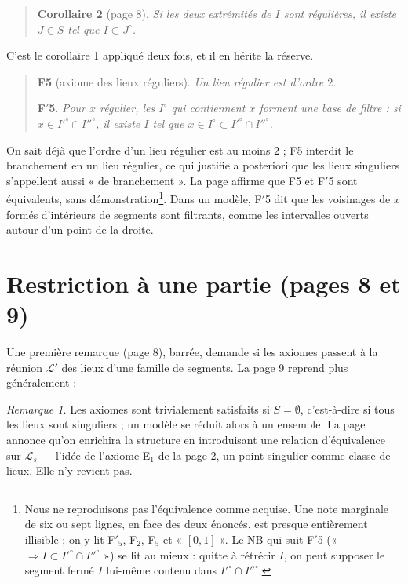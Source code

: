 \documentclass[11pt,a4paper]{article}
\begin{document}
\begin{quote}
\textbf{Corollaire 2} (page 8). \emph{Si les deux extrémités de $I$ sont
régulières, il existe $J \in S$ tel que $I \subset J^{\circ}$.}
\end{quote}

C'est le corollaire 1 appliqué deux fois, et il en hérite la réserve.

\begin{quote}
\textbf{F5} (axiome des lieux réguliers). \emph{Un lieu régulier est d'ordre
$2$.}

\textbf{F$'$5}. \emph{Pour $x$ régulier, les $I^{\circ}$ qui contiennent $x$
forment une base de filtre : si $x \in I'^{\circ} \cap I''^{\circ}$, il
existe $I$ tel que $x \in I^{\circ} \subset I'^{\circ} \cap I''^{\circ}$.}
\end{quote}

On sait déjà que l'ordre d'un lieu régulier est au moins $2$ ; F5 interdit le
branchement en un lieu régulier, ce qui justifie a posteriori que les
lieux singuliers s'appellent aussi « de branchement ». La page affirme que F5
et F$'$5 sont équivalents, sans démonstration\footnote{Nous ne reproduisons
pas l'équivalence comme acquise. Une note marginale de six ou sept lignes, en
face des deux énoncés, est presque entièrement illisible ; on y lit F$'_{5}$,
F$_{2}$, F$_{5}$ et « $[0,1]$ ». Le NB qui suit F$'$5 (« $\Longrightarrow I
\subset I'^{\circ} \cap I''^{\circ}$ ») se lit au mieux : quitte à rétrécir
$I$, on peut supposer le segment fermé $I$ lui-même contenu dans
$I'^{\circ} \cap I''^{\circ}$.}. Dans un modèle, F$'$5 dit que les
voisinages de $x$ formés d'intérieurs de segments sont filtrants, comme les
intervalles ouverts autour d'un point de la droite.

\section*{Restriction à une partie (pages 8 et 9)}

Une première remarque (page 8), barrée, demande si les axiomes passent à la
réunion $\mathcal{L}'$ des lieux d'une famille de segments. La page 9 reprend
plus généralement :

\emph{Remarque 1.} Les axiomes sont trivialement satisfaits si $S =
\emptyset$, c'est-à-dire si tous les lieux sont singuliers ; un modèle se
réduit alors à un ensemble. La page annonce qu'on enrichira la structure en
introduisant une relation d'équivalence sur $\mathcal{L}_{s}$ --- l'idée de
l'axiome E$_{1}$ de la page 2, un point singulier comme classe de lieux. Elle
n'y revient pas.
\end{document}
